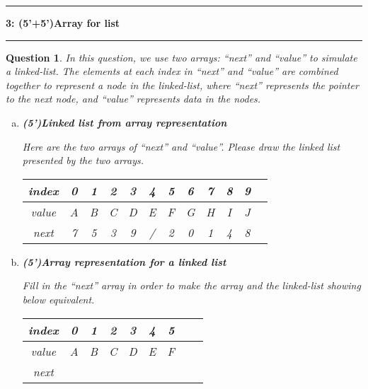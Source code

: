\documentclass[10.5pt]{article}
\newcommand\question[2]{\vspace{.25in}\hrule\textbf{#1: #2}\vspace{.5em}\hrule\vspace{.10in}}
\newtheorem{Q}{Question}
\begin{document}
	\question{3}{(5'+5')Array for list}
	\begin{Q}
	In this question, we use two arrays: ``next'' and ``value'' to simulate a linked-list. 
	The elements at each index in ``next'' and ``value'' 
	are combined together to represent a node in the 
	linked-list, where ``next'' represents the pointer 
	to the next node, and ``value'' represents data in 
	the nodes.
	\begin{enumerate}[(a)]
		\item \textbf{(5')Linked list from array representation}
		

		Here are the two arrays of ``next'' and ``value''.
		Please draw the linked list presented by the two arrays.
		\begin{center}
		\begin{tabular}{|c|c|c|c|c|c|c|c|c|c|c|c|}
			\hline
			index&0&1&2&3&4&5&6&7&8&9\\
			\hline
			value&A&B&C&D&E&F&G&H&I&J\\
			\hline
			next&7&5&3&9&/&2&0&1&4&8\\
			\hline

		\end{tabular}
			
	\end{center}
		\vspace{3cm}
		\item \textbf{(5')Array representation for a linked list}
		 
		Fill in  the ``next'' array in order to make the array and the linked-list showing below equivalent.

		\begin{center}
	
	\end{center}
		
	\begin{center}
		\begin{tabular}{|c|c|c|c|c|c|c|c|c|}
			\hline
			index&0&1&2&3&4&5\\
			\hline
			value&A&B&C&D&E&F\\
			\hline
			next&&&&&&\\
			\hline

		\end{tabular}
			
	\end{center}

	\end{enumerate}
	\end{Q}
\end{document}
